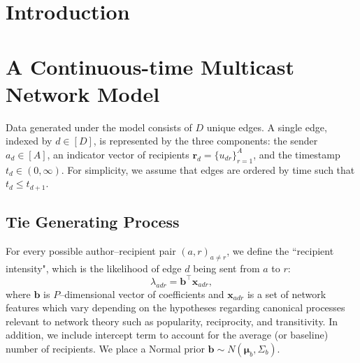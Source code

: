\documentclass[12pt]{article}
\begin{document}
\newpage
{} %
\section{Introduction}\label{sec:intro}
\section{A Continuous-time Multicast Network Model}\label{sec:generative process}
Data generated under the model consists of $D$ unique edges. A single edge, indexed by $d \in [D]$, is represented by the three components: the sender $a_d \in [A]$, an indicator vector of recipients $\boldsymbol{r}_d = \{u_{dr} \}_{r=1}^{A}$, and the timestamp $t_d \in (0, \infty)$. For simplicity, we assume that edges are ordered by time such that $t_d \leq t_{d+1}$.
\subsection{Tie Generating Process}\label{subsec: Tie}
For every possible author--recipient pair $(a,r)_{a \neq r}$, we define the ``recipient intensity", which is the likelihood of edge $d$ being sent from $a$ to $r$:
\begin{equation}
\lambda_{adr} = {\boldsymbol{b}}^{\top}\boldsymbol{x}_{adr},
\end{equation}
where $\boldsymbol{b}$ is $P$--dimensional vector of coefficients and $\boldsymbol{x}_{adr}$ is a set of network features which vary depending on the hypotheses regarding canonical processes relevant to network theory such as popularity, reciprocity, and transitivity. In addition, we include intercept term to account for the average (or baseline) number of recipients. We place a Normal prior $\boldsymbol{b} \sim N(\boldsymbol{\mu}_b, \Sigma_b)$.
\end{document}
